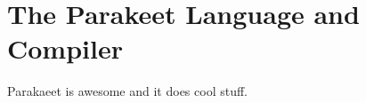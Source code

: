 \chapter{The Parakeet Language and Compiler\label{chap:parakeet}}

Parakaeet is awesome and it does cool stuff.

